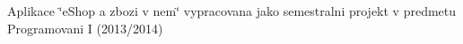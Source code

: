 Aplikace \char`\"{}e\-Shop a zbozi v nem\char`\"{} vypracovana jako semestralni projekt v predmetu Programovani I (2013/2014) 
